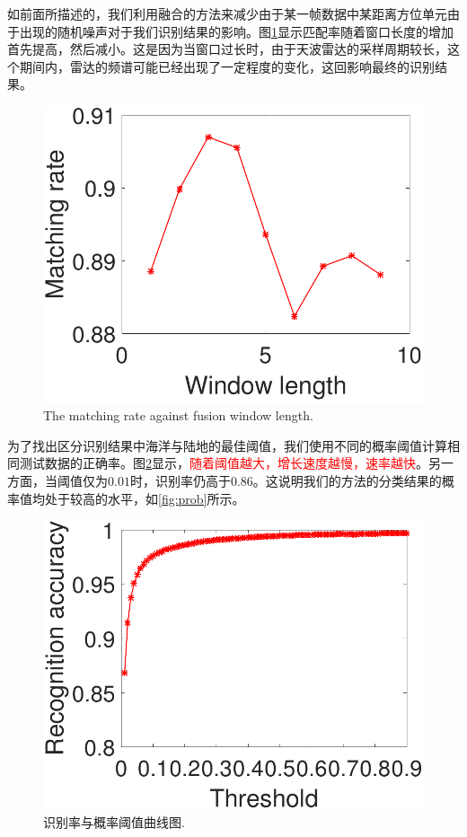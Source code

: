如前面所描述的，我们利用融合的方法来减少由于某一帧数据中某距离方位单元由于出现的随机噪声对于我们识别结果的影响。图\ref{fig:window}显示匹配率随着窗口长度的增加首先提高，然后减小。这是因为当窗口过长时，由于天波雷达的采样周期较长，这个期间内，雷达的频谱可能已经出现了一定程度的变化，这回影响最终的识别结果。
\begin{figure}[!t]
	\centering
	\includegraphics[width=\textwidth]{figures/window}
	\caption{The matching rate against fusion window length.}
	\label{fig:window}
\end{figure}
为了找出区分识别结果中海洋与陆地的最佳阈值，我们使用不同的概率阈值计算相同测试数据的正确率。图\ref{fig:threshold}显示，\textcolor{red}{随着阈值越大，增长速度越慢，速率越快}。另一方面，当阈值仅为$0.01$时，识别率仍高于$0.86$。这说明我们的方法的分类结果的概率值均处于较高的水平，如\ref{fig:prob}所示。
\begin{figure}[!t]
	\centering
	\includegraphics[width=\textwidth]{figures/threashold}
	\caption{识别率与概率阈值曲线图.}
	\label{fig:threshold}
\end{figure}
